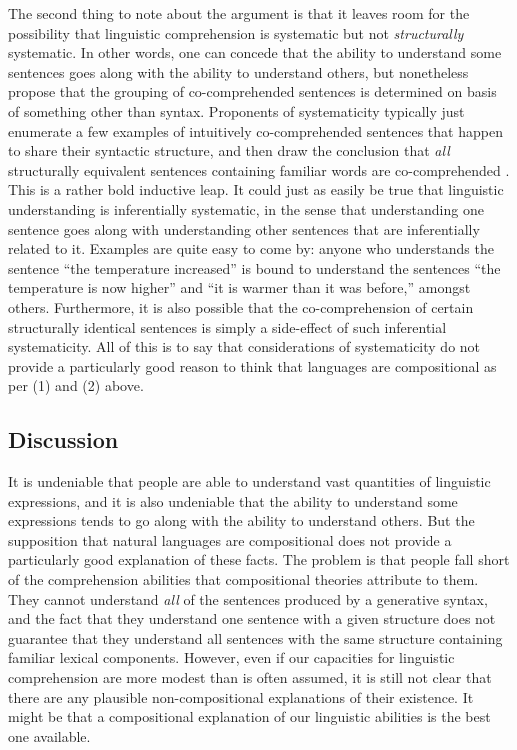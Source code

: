 The second thing to note about the argument is that it leaves room for the possibility that linguistic comprehension is systematic but not \textit{structurally} systematic. In other words, one can concede that the ability to understand some sentences goes along with the ability to understand others, but nonetheless propose that the grouping of co-comprehended sentences is determined on basis of something other than syntax. Proponents of systematicity typically just enumerate a few examples of intuitively co-comprehended sentences that happen to share their syntactic structure, and then draw the conclusion that \textit{all} structurally equivalent sentences containing familiar words are co-comprehended \citep[e.g.,][]{FodorPylyshyn:1988}. This is a rather bold inductive leap. It could just as easily be true that linguistic understanding is inferentially systematic, in the sense that understanding one sentence goes along with understanding other sentences that are inferentially related to it. Examples are quite easy to come by: anyone who understands the sentence ``the temperature increased'' is bound to understand the sentences ``the temperature is now higher'' and ``it is warmer than it was before,'' amongst others. Furthermore, it is also possible that the co-comprehension of certain structurally identical sentences is simply a side-effect of such inferential systematicity. All of this is to say that considerations of systematicity do not provide a particularly good reason to think that languages are compositional as per (1) and (2) above. 

\subsection{Discussion}

It is undeniable that people are able to understand vast quantities of linguistic expressions, and it is also undeniable that the ability to understand some expressions tends to go along with the ability to understand others. But the supposition that natural languages are compositional does not provide a particularly good explanation of these facts. The problem is that people fall short of the comprehension abilities that compositional theories attribute to them. They cannot understand \textit{all} of the sentences produced by a generative syntax, and the fact that they understand one sentence with a given structure does not guarantee that they understand all sentences with the same structure containing familiar lexical components. However, even if our capacities for linguistic comprehension are more modest than is often assumed, it is still not clear that there are any plausible non-compositional explanations of their existence. It might be that a compositional explanation of our linguistic abilities is the best one available. 

